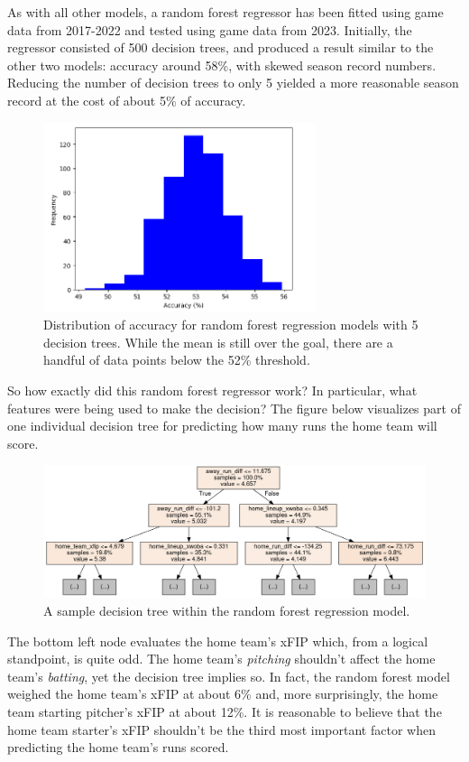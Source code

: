 \documentclass{paper}
\begin{document}
As with all other models, a random forest regressor has been fitted using game data from 2017-2022 and tested using game data from 2023. Initially, the regressor consisted of 500 decision trees, and produced a result similar to the other two models: accuracy around 58\%, with skewed season record numbers. Reducing the number of decision trees to only 5 yielded a more reasonable season record at the cost of about 5\% of accuracy.

\begin{figure}[H]
  \centering
  \includegraphics[width=8cm]{fig8}
  \caption{Distribution of accuracy for random forest regression models with 5 decision trees. While the mean is still over the goal, there are a handful of data points below the 52\% threshold.}
\end{figure}

So how exactly did this random forest regressor work? In particular, what features were being used to make the decision? The figure below visualizes part of one individual decision tree for predicting how many runs the home team will score.

\begin{figure}[H]
  \centering
  \includegraphics[width=13cm]{fig9}
  \caption{A sample decision tree within the random forest regression model.}
\end{figure}

The bottom left node evaluates the home team's xFIP which, from a logical standpoint, is quite odd. The home team's \textit{pitching} shouldn't affect the home team's \textit{batting}, yet the decision tree implies so. In fact, the random forest model weighed the home team's xFIP at about 6\% and, more surprisingly, the home team starting pitcher's xFIP at about 12\%. It is reasonable to believe that the home team starter's xFIP shouldn't be the third most important factor when predicting the home team's runs scored.
\end{document}
